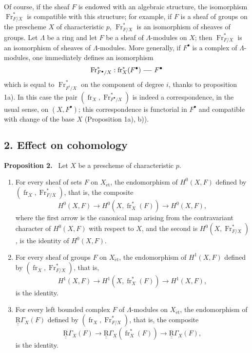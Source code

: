 \documentclass[11pt]{article}
\newenvironment{statement}[1]{\par\medskip\noindent\textbf{#1.}\ }{\par\medskip}
\providecommand{\et}{\mathrm{\acute{e}t}}
\providecommand{\fr}{\operatorname{fr}}
\providecommand{\Fr}{\operatorname{Fr}}
\providecommand{\Fr}{\operatorname{Fr}}
\providecommand{\fr}{\operatorname{fr}}
\providecommand{\et}{\acute{e}t}
\begin{document}
Of course, if the sheaf $F$ is endowed with an algebraic structure, the isomorphism $\Fr^*_{F/X}$ is compatible with this structure; for example, if $F$ is a sheaf of groups on the prescheme $X$ of characteristic $p$, $\Fr^*_{F/X}$ is an isomorphism of sheaves of groups. Let $\Lambda$ be a ring and let $F$ be a sheaf of $\Lambda$-modules on $X$; then $\Fr^*_{F/X}$ is an isomorphism of sheaves of $\Lambda$-modules. More generally, if $F^\bullet$ is a complex of $\Lambda$-modules, one immediately defines an isomorphism
\[
\Fr^*_{F^\bullet/X}:\fr_X^*(F^\bullet)\relbar\joinrel\relbar F^\bullet
\]
which is equal to $\Fr^*_{F^i/X}$ on the component of degree $i$, thanks to proposition 1a). In this case the pair $(\fr_X,\Fr^*_{F^\bullet/X})$ is indeed a correspondence, in the usual sense, on $(X,F^\bullet)$; this correspondence is functorial in $F^\bullet$ and compatible with change of the base $X$ (Proposition 1a), b)).

\subsection*{2. Effect on cohomology}

\begin{statement}{Proposition 2}
Let $X$ be a prescheme of characteristic $p$.
\begin{enumerate}[label=\alph*)]
\item For every sheaf of sets $F$ on $X_{\et}$, the endomorphism of $H^0(X,F)$ defined by $(\fr_X,\Fr^*_{F/X})$, that is, the composite
\[
H^0(X,F)\longrightarrow H^0(X,\fr_X^*(F))\longrightarrow H^0(X,F),
\]
where the first arrow is the canonical map arising from the contravariant character of $H^0(X,F)$ with respect to $X$, and the second is $H^0(X,\Fr^*_{F/X})$, is the identity of $H^0(X,F)$.
\item For every sheaf of groups $F$ on $X_{\et}$, the endomorphism of $H^1(X,F)$ defined by $(\fr_X,\Fr^*_{F/X})$, that is,
\[
H^1(X,F)\longrightarrow H^1(X,\fr_X^*(F))\longrightarrow H^1(X,F),
\]
is the identity.
\item For every left bounded complex $F$ of $\Lambda$-modules on $X_{\et}$, the endomorphism of $\underline{\underline{\mathrm{R}}}\Gamma_X(F)$ defined by $(\fr_X,\Fr^*_{F/X})$, that is, the composite
\[
\underline{\underline{\mathrm{R}}}\Gamma_X(F)\longrightarrow \underline{\underline{\mathrm{R}}}\Gamma_X(\fr_X^*(F))\longrightarrow \underline{\underline{\mathrm{R}}}\Gamma_X(F),
\]
is the identity.
\end{enumerate}
\end{statement}
\end{document}
